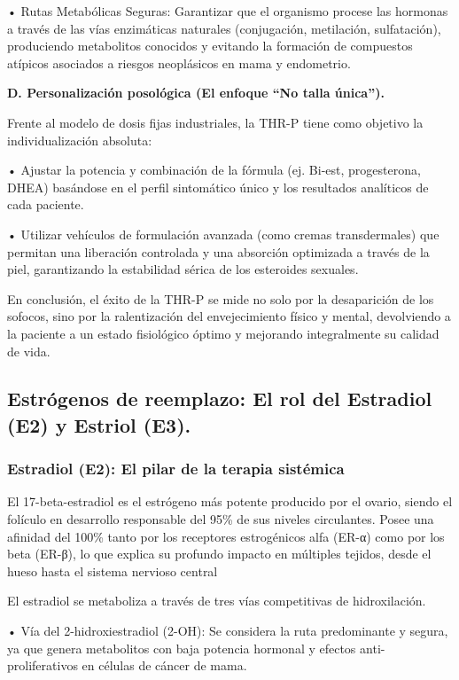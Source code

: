 \documentclass[
  spanish,
]{article}
\begin{document}
• Rutas Metabólicas Seguras: Garantizar que el organismo procese las hormonas a través de las vías enzimáticas naturales (conjugación, metilación, sulfatación), produciendo metabolitos conocidos y evitando la formación de compuestos atípicos asociados a riesgos neoplásicos en mama y endometrio.

\textbf{D. Personalización posológica (El enfoque ``No talla única'').}

Frente al modelo de dosis fijas industriales, la THR-P tiene como objetivo la individualización absoluta:

• Ajustar la potencia y combinación de la fórmula (ej. Bi-est, progesterona, DHEA) basándose en el perfil sintomático único y los resultados analíticos de cada paciente.

• Utilizar vehículos de formulación avanzada (como cremas transdermales) que permitan una liberación controlada y una absorción optimizada a través de la piel, garantizando la estabilidad sérica de los esteroides sexuales.

En conclusión, el éxito de la THR-P se mide no solo por la desaparición de los sofocos, sino por la ralentización del envejecimiento físico y mental, devolviendo a la paciente a un estado fisiológico óptimo y mejorando integralmente su calidad de vida.

\subsection{Estrógenos de reemplazo: El rol del Estradiol (E2) y Estriol (E3).}\label{estruxf3genos-de-reemplazo-el-rol-del-estradiol-e2-y-estriol-e3.}

\subsubsection{Estradiol (E2): El pilar de la terapia sistémica}\label{estradiol-e2-el-pilar-de-la-terapia-sistuxe9mica}

El 17-beta-estradiol es el estrógeno más potente producido por el ovario, siendo el folículo en desarrollo responsable del 95\% de sus niveles circulantes. Posee una afinidad del 100\% tanto por los receptores estrogénicos alfa (ER-α) como por los beta (ER-β), lo que explica su profundo impacto en múltiples tejidos, desde el hueso hasta el sistema nervioso central

El estradiol se metaboliza a través de tres vías competitivas de hidroxilación.

• Vía del 2-hidroxiestradiol (2-OH): Se considera la ruta predominante y segura, ya que genera metabolitos con baja potencia hormonal y efectos anti-proliferativos en células de cáncer de mama.
\end{document}
